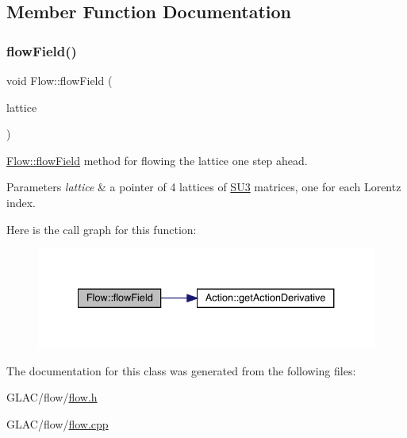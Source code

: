 \subsection{Member Function Documentation}
\mbox{\label{class_flow_a284b490ddedc9cf5d0f2ab0660c328f6}} 
\subsubsection{\texorpdfstring{flowField()}{flowField()}}
{\footnotesize\ttfamily void Flow\+::flow\+Field (\begin{DoxyParamCaption}\item[{\mbox{\hyperlink{class_lattice}{Lattice}}$<$ \mbox{\hyperlink{class_s_u3}{S\+U3}} $>$ $\ast$}]{lattice }\end{DoxyParamCaption})}



\mbox{\hyperlink{class_flow_a284b490ddedc9cf5d0f2ab0660c328f6}{Flow\+::flow\+Field}} method for flowing the lattice one step ahead. 


\begin{DoxyParams}{Parameters}
{\em lattice} & a pointer of 4 lattices of \mbox{\hyperlink{class_s_u3}{S\+U3}} matrices, one for each Lorentz index. \\
\hline
\end{DoxyParams}
Here is the call graph for this function\+:
\nopagebreak
\begin{figure}[H]
\begin{center}
\leavevmode
\includegraphics[width=334pt]{class_flow_a284b490ddedc9cf5d0f2ab0660c328f6_cgraph}
\end{center}
\end{figure}


The documentation for this class was generated from the following files\+:\begin{DoxyCompactItemize}
\item 
G\+L\+A\+C/flow/\mbox{\hyperlink{flow_8h}{flow.\+h}}\item 
G\+L\+A\+C/flow/\mbox{\hyperlink{flow_8cpp}{flow.\+cpp}}\end{DoxyCompactItemize}
